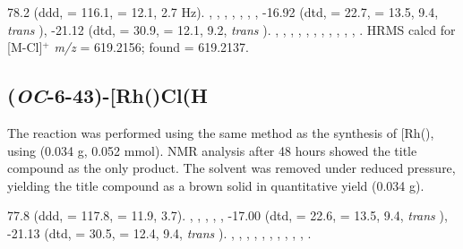 78.2 (ddd, \JRhP{} = 116.1, \JPH{} = 12.1, 2.7 Hz).
,
,
,
,
,
,
,
-16.92 (dtd, \JRhH{} = 22.7, \JPH{} = 13.5, \JHH{} 9.4,  \emph{trans} ),
-21.12 (dtd, \JRhH{} = 30.9, \JPH{} = 12.1, \JHH{} 9.2,  \emph{trans} ).
,
,
,
,
,
,
,
,
,
,
,
.
HRMS calcd for  [M-Cl]$^+$ \emph{m/z} = 619.2156; found = 619.2137.


\subsection*{(\emph{OC}-6-43)-\texorpdfstring{[Rh(\tButhixantphosk)Cl(H\ce{)2]}} R}


The reaction was performed using the same method as the synthesis of [Rh(\tBusixantphos)\ce{Cl(H)2]}, using \tButhixantphos{} (0.034 g, 0.052 mmol).  NMR analysis after 48 hours showed the title compound as the only product.  The solvent was removed under reduced pressure, yielding the title compound as a brown solid in quantitative yield (0.034 g).  

77.8 (ddd, \JRhP{} = 117.8, \JPH{} = 11.9, 3.7).
,
,
,
,
,
-17.00 (dtd, \JRhH{} = 22.6, \JPH{} = 13.5, \JHH{} 9.4,  \emph{trans} ),
-21.13 (dtd, \JRhH{} = 30.5, \JPH{} = 12.4, \JHH{} 9.4,  \emph{trans} ).
,
,
,
,
,
,
,
,
,
,
.

